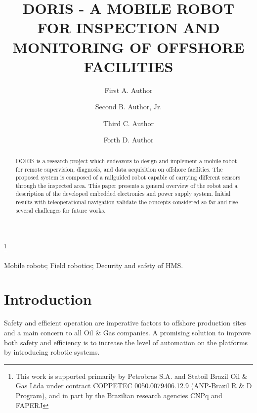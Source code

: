 \documentclass{ifacconf}
\begin{document}
\begin{frontmatter}

\title{DORIS - A MOBILE ROBOT FOR INSPECTION AND MONITORING OF
OFFSHORE FACILITIES} 

\thanks[footnoteinfo]{This work is supported primarily by Petrobras S.A. and
Statoil Brazil Oil \& Gas Ltda under contract COPPETEC 0050.0079406.12.9
(ANP-Brazil R \& D Program), and in part by the Brazilian research agencies CNPq
and FAPERJ}

\author[First]{First A. Author} 
\author[Second]{Second B. Author, Jr.} 
\author[Third]{Third C. Author}
\author[Forth]{Forth D. Author}

\address[First]{Research and Development Center, Petrobras/CENPES, Rio de
Janeiro, Brazil} 
\address[Second]{Mathematical Sciences and Technology Department, Norwegian
University of Life Sciences, Oslo, Norwegian }
\address[Third]{Electrical
Engineering Department, COPPE UFRJ, Rio de Janeiro, Brazil, (e-mail: )}
\address[Forth]{TPD RD New Development Solutions, Statoil ASA}

\begin{abstract}                %
DORIS is a research project which endeavors to design and implement a mobile
robot for remote supervision, diagnosis, and data acquisition on offshore
facilities. The proposed system is composed of a railguided robot capable of
carrying different sensors through the inspected area. This paper presents a
general overview of the robot and a description of the developed embedded
electronics and power supply system. Initial results with teleoperational
navigation validate the concepts considered so far and rise several challenges
for future works.
\end{abstract}

\begin{keyword}
Mobile robots; Field robotics; Decurity and safety of HMS.
\end{keyword}

\end{frontmatter}

\section{Introduction}
Safety and efficient operation are imperative factors to offshore production
sites and a main concern to all Oil \& Gas companies. A promising solution to
improve both safety and efficiency is to increase the level of automation on
the platforms by introducing robotic systems.
\end{document}
